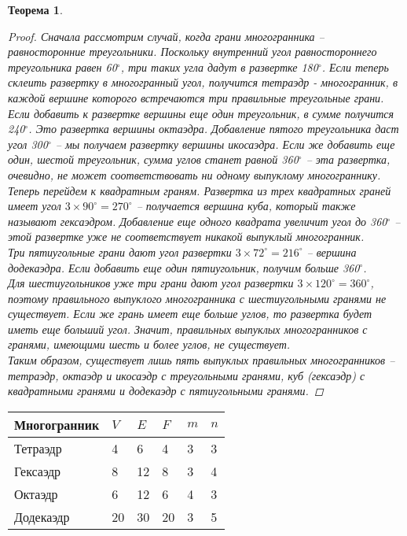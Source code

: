 \documentclass[12pt]{article}
\newtheorem{theorem}{Теорема}
\begin{document}
\begin{enumerate}
\begin{theorem}
\begin{proof}
Сначала рассмотрим случай, когда грани многогранника -- равносторонние треугольники. Поскольку внутренний угол равностороннего треугольника равен 60$^\circ$, три таких угла дадут в развертке 180$^\circ$. Если теперь склеить развертку в многогранный угол, получится тетраэдр - многогранник, в каждой вершине которого встречаются три правильные треугольные грани. Если добавить к развертке вершины еще один треугольник, в сумме получится 240$^\circ$. Это развертка вершины октаэдра. Добавление пятого треугольника даст угол 300$^\circ$ -- мы получаем развертку вершины икосаэдра. Если же добавить еще один, шестой треугольник, сумма углов станет равной 360$^\circ$ -- эта развертка, очевидно, не может соответствовать ни одному выпуклому многограннику.\\
Теперь перейдем к квадратным граням. Развертка из трех квадратных граней имеет угол $3\times90^\circ=270^\circ$ -- получается вершина куба, который также называют гексаэдром. Добавление еще одного квадрата увеличит угол до 360$^\circ$ -- этой развертке уже не соответствует никакой выпуклый многогранник.\\
Три пятиугольные грани дают угол развертки $3\times72^\circ=216^\circ$ -- вершина додекаэдра. Если добавить еще один пятиугольник, получим больше 360$^\circ$.\\
Для шестиугольников уже три грани дают угол развертки $3\times120^\circ=360^\circ$, поэтому правильного выпуклого многогранника с шестиугольными гранями не существует. Если же грань имеет еще больше углов, то развертка будет иметь еще больший угол. Значит, правильных выпуклых многогранников с гранями, имеющими шесть и более углов, не существует.\\
Таким образом, существует лишь пять выпуклых правильных многогранников -- тетраэдр, октаэдр и икосаэдр с треугольными гранями, куб (гексаэдр) с квадратными гранями и додекаэдр с пятиугольными гранями.
\end{proof}
\end{theorem}
\begin{table}[h!]
\centering
\begin{tabular}{|l|l|l|l|l|l|}
\hline
Многогранник & $V$  & $E$  & $F$  & $m$ & $n$ \\ \hline
Тетраэдр     & 4  & 6  & 4  & 3 & 3 \\ \hline
Гексаэдр     & 8  & 12 & 8  & 3 & 4 \\ \hline
Октаэдр      & 6  & 12 & 6  & 4 & 3 \\ \hline
Додекаэдр    & 20 & 30 & 20 & 3 & 5 \\ \hline

\end{tabular}
\end{table}
\end{enumerate}
\end{document}
